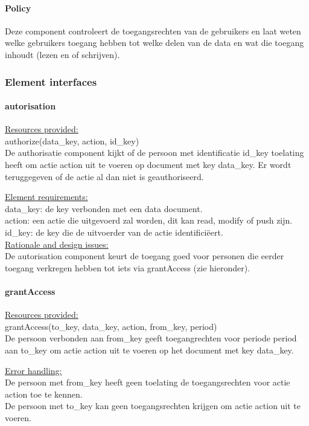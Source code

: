 \documentclass[a4paper,10pt]{article}
\begin{document}
\paragraph{Policy}
Deze component controleert de toegangsrechten van de gebruikers en laat weten welke gebruikers toegang hebben tot welke delen van de data en wat die toegang inhoudt (lezen en of schrijven).

\subsubsection{Element interfaces} 

\paragraph{autorisation}
\underline{Resources provided:}\\
authorize(data\_key, action, id\_key)\\
De authorisatie component kijkt of de persoon met identificatie id\_key toelating heeft om actie action uit te voeren op document met key data\_key.  Er wordt teruggegeven of de actie al dan niet is geauthoriseerd.

\underline{Element requirements:}\\
data\_key: de key verbonden met een data document.\\
action: een actie die uitgevoerd zal worden, dit kan read, modify of push zijn.\\
id\_key: de key die de uitvoerder van de actie identifici\"{e}ert.\\

\underline{Rationale and design issues:}\\
De autorisation component keurt de toegang goed voor personen die eerder toegang verkregen hebben tot iets via grantAccess (zie hieronder).

\paragraph{grantAccess}
\underline{Resources provided:}\\
grantAccess(to\_key, data\_key, action, from\_key, period)\\
De persoon verbonden aan from\_key geeft toegangrechten voor periode period aan to\_key om actie action uit te voeren op het document met key data\_key.

\underline{Error handling:}\\
De persoon met from\_key heeft geen toelating de toegangsrechten voor actie action toe te kennen.\\
De persoon met to\_key kan geen toegangsrechten krijgen om actie action uit te voeren.\\
\end{document}
